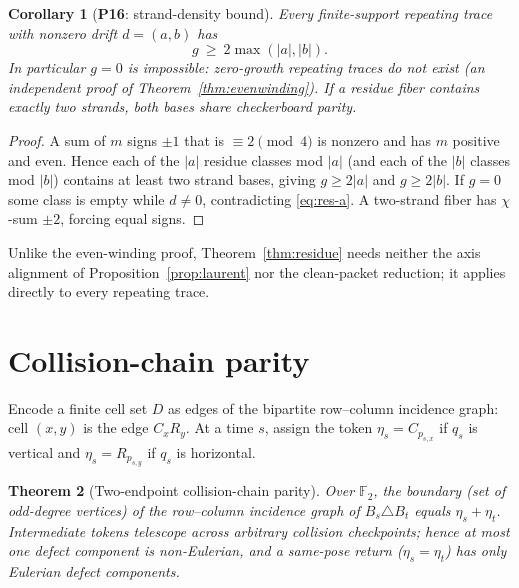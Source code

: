 \documentclass[11pt,reqno]{amsart}
\theoremstyle{plain}
\newtheorem{theorem}{Theorem}[section]
\newtheorem{corollary}[theorem]{Corollary}
\theoremstyle{definition}
\newcommand{\F}{\mathbb{F}}
\newcommand{\che}{\chi}                 %
\newcommand{\drift}{d}
\newcommand{\growth}{g}
\newcommand{\PN}[1]{\textbf{P#1}}
\begin{document}
\begin{corollary}[\PN{16}: strand-density bound]\label{cor:P16}
Every finite-support repeating trace with nonzero drift $\drift=(a,b)$ has
\begin{equation}\label{eq:P16}
\growth\ \ge\ 2\max(|a|,|b|).
\end{equation}
In particular $\growth=0$ is impossible: zero-growth repeating traces do not
exist (an independent proof of Theorem~\ref{thm:evenwinding}). If a residue fiber
contains exactly two strands, both bases share checkerboard parity.
\end{corollary}

\begin{proof}
A sum of $m$ signs $\pm1$ that is $\equiv2\pmod4$ is nonzero and has $m$ positive
and even. Hence each of the $|a|$ residue classes mod $|a|$ (and each of the $|b|$
classes mod $|b|$) contains at least two strand bases, giving $\growth\ge2|a|$ and
$\growth\ge2|b|$. If $\growth=0$ some class is empty while $\drift\neq0$,
contradicting \eqref{eq:res-a}. A two-strand fiber has $\che$-sum $\pm2$, forcing
equal signs.
\end{proof}

Unlike the even-winding proof, Theorem~\ref{thm:residue} needs neither the axis
alignment of Proposition~\ref{prop:laurent} nor the clean-packet reduction; it
applies directly to every repeating trace.

\section{Collision-chain parity}\label{sec:interlace}

Encode a finite cell set $D$ as edges of the bipartite row--column incidence
graph: cell $(x,y)$ is the edge $C_xR_y$. At a time $s$, assign the token
$\eta_s=C_{p_{s,x}}$ if $q_s$ is vertical and $\eta_s=R_{p_{s,y}}$ if $q_s$ is
horizontal.

\begin{theorem}[Two-endpoint collision-chain parity]\label{thm:collision}
Over $\F_2$, the boundary (set of odd-degree vertices) of the row--column incidence
graph of $B_s\triangle B_t$ equals $\eta_s+\eta_t$. Intermediate tokens telescope
across arbitrary collision checkpoints; hence at most one defect component is
non-Eulerian, and a same-pose return ($\eta_s=\eta_t$) has only Eulerian defect
components.
\end{theorem}
\end{document}
